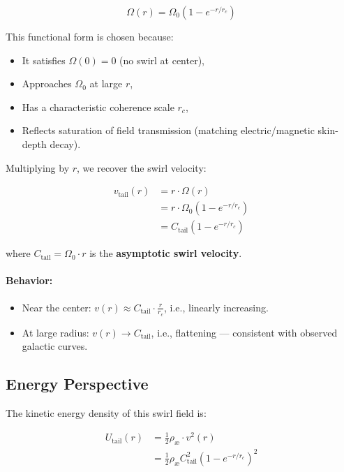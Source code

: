 \documentclass[12pt]{article}
\begin{document}
\begin{equation}
    \Omega(r) = \Omega_0 \left( 1 - e^{-r/r_c} \right)
    \label{eq:omega_saturation}
\end{equation}

This functional form is chosen because:
\begin{itemize}
    \item It satisfies \( \Omega(0) = 0 \) (no swirl at center),
    \item Approaches \( \Omega_0 \) at large \( r \),
    \item Has a characteristic coherence scale \( r_c \),
    \item Reflects saturation of field transmission (matching electric/magnetic skin-depth decay).
\end{itemize}

Multiplying by \( r \), we recover the swirl velocity:

\begin{align}
    v_\text{tail}(r)
    &= r \cdot \Omega(r) \\
    &= r \cdot \Omega_0 \left( 1 - e^{-r/r_c} \right) \\
    &= C_{\text{tail}} \left( 1 - e^{-r/r_c} \right)
    \label{eq:tail_velocity}
\end{align}

where \( C_{\text{tail}} = \Omega_0 \cdot r \) is the \textbf{asymptotic swirl velocity}.

\paragraph{Behavior:}
\begin{itemize}
    \item Near the center: \( v(r) \approx C_{\text{tail}} \cdot \frac{r}{r_c} \), i.e., linearly increasing.
    \item At large radius: \( v(r) \to C_{\text{tail}} \), i.e., flattening — consistent with observed galactic curves.
\end{itemize}

\subsection{Energy Perspective}

The kinetic energy density of this swirl field is:

\begin{align}
    U_\text{tail}(r)
    &= \frac{1}{2} \rho_{\text{\ae}} \cdot v^2(r) \\
    &= \frac{1}{2} \rho_{\text{\ae}} C_{\text{tail}}^2 \left( 1 - e^{-r/r_c} \right)^2
    \label{eq:tail_energy_density}
\end{align}
\end{document}

